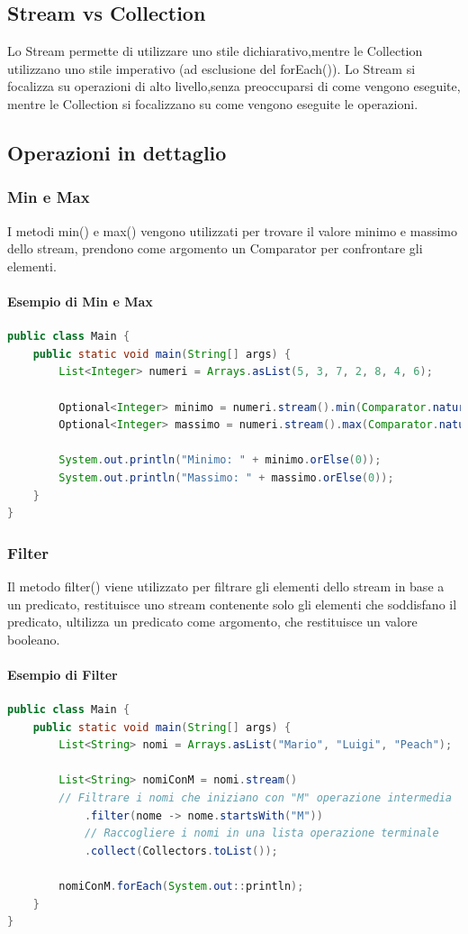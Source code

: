 \documentclass[11pt]{article}
\begin{document}
\subsection{Stream vs Collection}
Lo Stream permette di utilizzare uno stile dichiarativo,mentre le Collection utilizzano uno stile imperativo (ad esclusione del forEach()).
Lo Stream si focalizza su operazioni di alto livello,senza preoccuparsi di come vengono eseguite, mentre le Collection si focalizzano su come vengono eseguite le operazioni.
\subsection{Operazioni in dettaglio}
\subsubsection{Min e Max}
I metodi min() e max() vengono utilizzati per trovare il valore minimo e massimo dello stream, prendono come argomento un Comparator per confrontare gli elementi.
\paragraph{Esempio di Min e Max}
\begin{lstlisting}[language=Java]
public class Main {
    public static void main(String[] args) {
        List<Integer> numeri = Arrays.asList(5, 3, 7, 2, 8, 4, 6);

        Optional<Integer> minimo = numeri.stream().min(Comparator.naturalOrder());
        Optional<Integer> massimo = numeri.stream().max(Comparator.naturalOrder());

        System.out.println("Minimo: " + minimo.orElse(0));
        System.out.println("Massimo: " + massimo.orElse(0));
    }
}
\end{lstlisting}
\subsubsection{Filter}
Il metodo filter() viene utilizzato per filtrare gli elementi dello stream in base a un predicato, restituisce uno stream contenente solo gli elementi che soddisfano il predicato,
ultilizza un predicato come argomento, che restituisce un valore booleano.
\paragraph{Esempio di Filter}
\begin{lstlisting}[language=Java]
public class Main {
    public static void main(String[] args) {
        List<String> nomi = Arrays.asList("Mario", "Luigi", "Peach");

        List<String> nomiConM = nomi.stream()
        // Filtrare i nomi che iniziano con "M" operazione intermedia
            .filter(nome -> nome.startsWith("M"))
            // Raccogliere i nomi in una lista operazione terminale
            .collect(Collectors.toList());

        nomiConM.forEach(System.out::println);
    }
}
\end{lstlisting}
\end{document}
